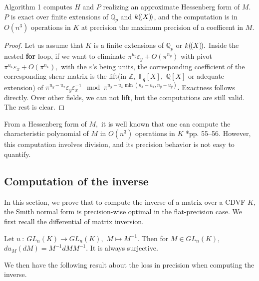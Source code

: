 \documentclass{sig-alternate-05-2015}
\newcommand{\llp}{(\mkern-2.5mu(}
\newcommand{\rrp}{)\mkern-2.5mu)}
\begin{document}
\begin{prop} 
Algorithm 1 computes $H$ and $P$ realizing an approximate Hessenberg form of $M.$
$P$ is exact over finite extensions of $\mathbb{Q}_p$ and $k\llp X\rrp$, and the computation is in $O(n^3)$ operations in $K$ at precision the maximum precision of a coefficent in $M.$
\end{prop}
\begin{proof}
Let us assume that $K$ is a finite extensions of $\mathbb{Q}_p$ or $k\llp X \rrp.$
Inside the nested \textbf{for} loop, if we want to eliminate $\pi^{u_y} \varepsilon_y+O(\pi^{n_y})$ with pivot $\pi^{u_x} \varepsilon_x+O(\pi^{n_x}),$
with the $\varepsilon$'s being units,
the corresponding coefficient of the corresponding shear matrix is the lift(in $\mathbb{Z}, $  $\mathbb{F}_q[X],$ $\mathbb{Q}[X]$ or adequate extension) of $\pi^{u_y-u_x} \varepsilon_y \varepsilon_x^{-1} \mod \pi^{u_y-u_x\min (n_x-u_x,n_y-u_y)}.$
Exactness follows directly. Over other fields, we can not lift, but the computations are still valid.
The rest is clear.
\end{proof}

\begin{rem} \label{rem:char_pol_from_hessenberg}
From a Hessenberg form of $M,$ it is well known
that one can compute the characteristic polynomial of 
$M$ in $O(n^3)$ operations in $K$ \cite{Cohen:2013}*{pp. 55--56}.
However, this computation involves division, and its
precision behavior is not easy to quantify.
\end{rem}


\subsection{Computation of the inverse}

In this section, we prove that to compute the inverse of
a matrix over a CDVF $K$, the Smith normal form is precision-wise optimal in the flat-precision case.
We first recall the differential of matrix inversion.

\begin{lem}
Let $u \: : \: GL_n (K) \rightarrow GL_n(K),$ $M \mapsto M^{-1}.$
Then for $M \in GL_n (K),$ $du_M(dM)=M^{-1} dM M^{-1}.$
It is always surjective.
\end{lem}

We then have the following result about the loss in precision when computing the inverse.
\end{document}
